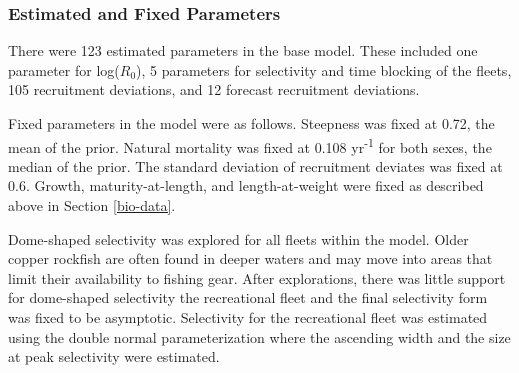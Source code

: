 \documentclass[11pt,
  english,
  a4paper,
]{article}
\begin{document}
\leavevmode\tagmcend\tagstructend\par


\hypertarget{estimated-and-fixed-parameters}{%
\subsubsection{Estimated and Fixed Parameters}\label{estimated-and-fixed-parameters}}

\leavevmode\tagmcend\tagstructend


There were 123 estimated parameters in the base model. These included one parameter for log({\(R_0\)\leavevmode\tagmcend\tagstructend}), 5 parameters for selectivity and time blocking of the fleets, 105 recruitment deviations, and 12 forecast recruitment deviations.

\leavevmode\tagmcend\tagstructend\par


Fixed parameters in the model were as follows. Steepness was fixed at 0.72, the mean of the prior. Natural mortality was fixed at 0.108 yr\textsuperscript{-1} for both sexes, the median of the prior. The standard deviation of recruitment deviates was fixed at 0.6. Growth, maturity-at-length, and length-at-weight were fixed as described above in Section \ref{bio-data}.

\leavevmode\tagmcend\tagstructend\par


Dome-shaped selectivity was explored for all fleets within the model. Older copper rockfish are often found in deeper waters and may move into areas that limit their availability to fishing gear. After explorations, there was little support for dome-shaped selectivity the recreational fleet and the final selectivity form was fixed to be asymptotic. Selectivity for the recreational fleet was estimated using the double normal parameterization where the ascending width and the size at peak selectivity were estimated.

\leavevmode\tagmcend\tagstructend\par

\end{document}
